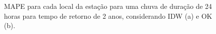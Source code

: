 \documentclass[
]{agujournal2019}
\begin{document}
\begin{figure}

\begin{minipage}{\linewidth}



\end{minipage}%
\newline
\begin{minipage}{\linewidth}



\end{minipage}%

\caption{\label{fig-Figura26}MAPE para cada local da estação para uma
chuva de duração de 24 horas para tempo de retorno de 2 anos,
considerando IDW (a) e OK (b).}

\end{figure}%
\end{document}
